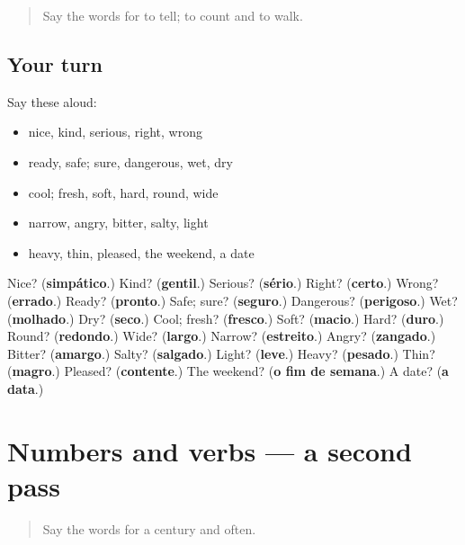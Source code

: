 \label{lesson:PT-R133-first-pass-more-describing-words-and-time}



\begin{quote}
Say the words for to tell; to count and to walk.
\end{quote}

\subsection*{Your turn}
Say these aloud:

\begin{itemize}
\raggedright
  \item nice, kind, serious, right, wrong
  \item ready, safe; sure, dangerous, wet, dry
  \item cool; fresh, soft, hard, round, wide
  \item narrow, angry, bitter, salty, light
  \item heavy, thin, pleased, the weekend, a date
\end{itemize}

\begin{tcolorbox}[breakable,colback=teal!4,colframe=teal!35!black,title={Before you move on}]
Nice? (\textbf{simpático}.) Kind? (\textbf{gentil}.) Serious? (\textbf{sério}.) Right? (\textbf{certo}.) Wrong? (\textbf{errado}.) Ready? (\textbf{pronto}.) Safe; sure? (\textbf{seguro}.) Dangerous? (\textbf{perigoso}.) Wet? (\textbf{molhado}.) Dry? (\textbf{seco}.) Cool; fresh? (\textbf{fresco}.) Soft? (\textbf{macio}.) Hard? (\textbf{duro}.) Round? (\textbf{redondo}.) Wide? (\textbf{largo}.) Narrow? (\textbf{estreito}.) Angry? (\textbf{zangado}.) Bitter? (\textbf{amargo}.) Salty? (\textbf{salgado}.) Light? (\textbf{leve}.) Heavy? (\textbf{pesado}.) Thin? (\textbf{magro}.) Pleased? (\textbf{contente}.) The weekend? (\textbf{o fim de semana}.) A date? (\textbf{a data}.)
\end{tcolorbox}
\section[(dialogue)]{Numbers and verbs — a second pass}

\label{lesson:PT-R133-second-pass-numbers-and-verbs}



\begin{quote}
Say the words for a century and often.
\end{quote}

